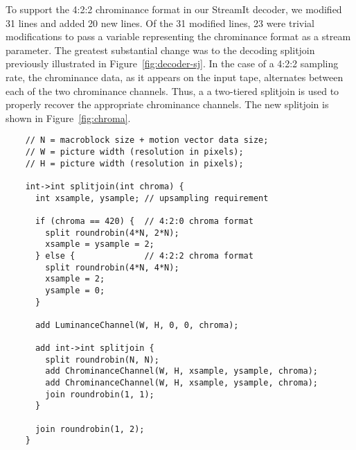 To support the 4:2:2 chrominance format in our StreamIt decoder, we
modified 31 lines and added 20 new lines. Of the 31 modified lines, 23
were trivial modifications to pass a variable representing the
chrominance format as a stream parameter. The greatest substantial
change was to the decoding splitjoin previously illustrated in
Figure~\ref{fig:decoder-sj}. In the case of a 4:2:2 sampling rate,
the chrominance data, as it appears on the input tape, alternates
between each of the two chrominance channels. Thus, a a two-tiered
splitjoin is used to properly recover the appropriate chrominance
channels. The new splitjoin is shown in Figure~\ref{fig:chroma}.
\begin{figure*}[t]
 \begin{minipage}[t]{4.3in}
   {
    \begin{scriptsize}
    \begin{verbatim} 
    // N = macroblock size + motion vector data size;
    // W = picture width (resolution in pixels);
    // H = picture width (resolution in pixels);

    int->int splitjoin(int chroma) {
      int xsample, ysample; // upsampling requirement

      if (chroma == 420) {  // 4:2:0 chroma format
        split roundrobin(4*N, 2*N);
        xsample = ysample = 2;
      } else {              // 4:2:2 chroma format
        split roundrobin(4*N, 4*N);
        xsample = 2;
        ysample = 0;
      }

      add LuminanceChannel(W, H, 0, 0, chroma);

      add int->int splitjoin {
        split roundrobin(N, N);
        add ChrominanceChannel(W, H, xsample, ysample, chroma);
        add ChrominanceChannel(W, H, xsample, ysample, chroma);
        join roundrobin(1, 1);
      }

      join roundrobin(1, 2);
    }
    \end{verbatim}
    \end{scriptsize}
   }
  \end{minipage}
  ~~\vrule~~
  \begin{minipage}[t]{2.0in}
  {
   \begin{center}
   \end{center}
  }
  \end{minipage}
  \caption{Decoding stream to handle 4:2:0 and 4:2:2 chroma
    formats. Figures on right illustrate how macroblock orderings
    differ.}
  \label{fig:chroma}
\end{figure*}



